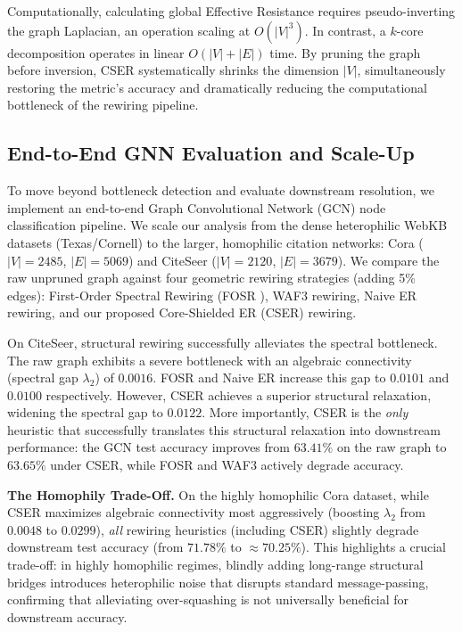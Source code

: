 \documentclass[10pt]{article} %
\begin{document}
Computationally, calculating global Effective Resistance requires pseudo-inverting the graph Laplacian, an operation scaling at $O(|V|^3)$. In contrast, a $k$-core decomposition operates in linear $O(|V| + |E|)$ time. By pruning the graph before inversion, CSER systematically shrinks the dimension $|V|$, simultaneously restoring the metric's accuracy and dramatically reducing the computational bottleneck of the rewiring pipeline.

\subsection{End-to-End GNN Evaluation and Scale-Up}
To move beyond bottleneck detection and evaluate downstream resolution, we implement an end-to-end Graph Convolutional Network (GCN) node classification pipeline. We scale our analysis from the dense heterophilic WebKB datasets (Texas/Cornell) to the larger, homophilic citation networks: Cora ($|V|=2485$, $|E|=5069$) and CiteSeer ($|V|=2120$, $|E|=3679$). We compare the raw unpruned graph against four geometric rewiring strategies (adding 5\% edges): First-Order Spectral Rewiring (FOSR \citep{Karhadkar2023}), WAF3 rewiring, Naive ER rewiring, and our proposed Core-Shielded ER (CSER) rewiring. 

On CiteSeer, structural rewiring successfully alleviates the spectral bottleneck. The raw graph exhibits a severe bottleneck with an algebraic connectivity (spectral gap $\lambda_2$) of $0.0016$. FOSR and Naive ER increase this gap to $0.0101$ and $0.0100$ respectively. However, CSER achieves a superior structural relaxation, widening the spectral gap to $0.0122$. More importantly, CSER is the \textit{only} heuristic that successfully translates this structural relaxation into downstream performance: the GCN test accuracy improves from $63.41\%$ on the raw graph to $63.65\%$ under CSER, while FOSR and WAF3 actively degrade accuracy.

\textbf{The Homophily Trade-Off.} On the highly homophilic Cora dataset, while CSER maximizes algebraic connectivity most aggressively (boosting $\lambda_2$ from $0.0048$ to $0.0299$), \textit{all} rewiring heuristics (including CSER) slightly degrade downstream test accuracy (from $71.78\%$ to $\approx 70.25\%$). This highlights a crucial trade-off: in highly homophilic regimes, blindly adding long-range structural bridges introduces heterophilic noise that disrupts standard message-passing, confirming that alleviating over-squashing is not universally beneficial for downstream accuracy.
\end{document}
